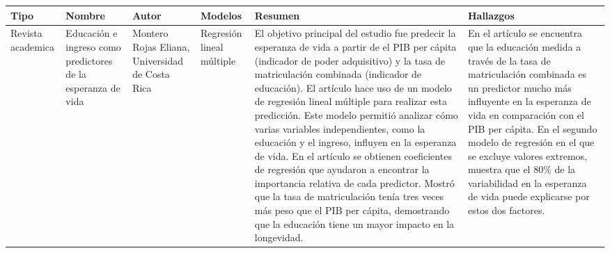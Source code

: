 \documentclass{scrartcl}
\begin{document}
\begin{landscape}

\thispagestyle{empty}


\begin{longtable}{|C{0.1\textwidth}|C{0.15\textwidth}|C{0.15\textwidth}|C{0.1\textwidth}|C{0.4\textwidth}|C{0.25\textwidth}|}
    \hline
    \textbf{Tipo} & \textbf{Nombre} & \textbf{Autor} & \textbf{Modelos} & \textbf{Resumen} & \textbf{Hallazgos}  \\ \hline
    Revista academica & Educación e ingreso como predictores de la esperanza de vida & Montero Rojas Eliana, Universidad de Costa Rica & Regresión lineal múltiple & El objetivo principal del estudio fue predecir la esperanza de vida a partir de el PIB per cápita (indicador de poder adquisitivo) y la tasa de matriculación combinada (indicador de educación). \newline
    El artículo hace uso de un modelo de regresión lineal múltiple para realizar esta predicción. Este modelo permitió analizar cómo varias variables independientes, como la educación y el ingreso, influyen en la esperanza de vida. \newline
    En el artículo se obtienen coeficientes de regresión que ayudaron a encontrar la importancia relativa de cada predictor. Mostró que la tasa de matriculación tenía tres veces más peso que el PIB per cápita, demostrando que la educación tiene un mayor impacto en la longevidad. \newline
    & En el artículo se encuentra que la educación medida a través de la tasa de matriculación combinada es un predictor mucho más influyente en la esperanza de vida en comparación con el PIB per cápita. En el segundo modelo de regresión en el que se excluye valores extremos, muestra que el 80\% de la variabilidad en la esperanza de vida puede explicarse por estos dos factores.  \\
\end{longtable}


\end{landscape}
\end{document}
